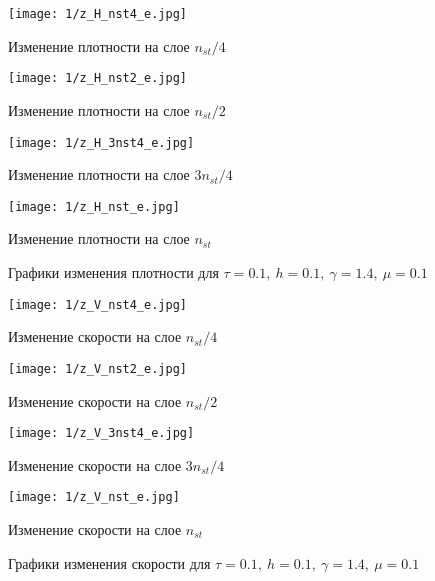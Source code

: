 \begin{figure}[h]
	\begin{minipage}[h]{0.47\linewidth}
		\centering
		\texttt{[image: 1/z\_H\_nst4\_e.jpg]} 
		\caption{Изменение плотности на слое $n_{st} / 4$}
	\end{minipage}
	\hfill
	\begin{minipage}[h]{0.47\linewidth}
		\centering
		\texttt{[image: 1/z\_H\_nst2\_e.jpg]} 
		\caption{Изменение плотности на слое $n_{st} / 2$}
	\end{minipage}
\end{figure}
\begin{figure}[h]
	\begin{minipage}[h]{0.47\linewidth}
		\centering
		\texttt{[image: 1/z\_H\_3nst4\_e.jpg]} 
		\caption{Изменение плотности на слое $3n_{st} / 4$}
	\end{minipage}
	\hfill
	\begin{minipage}[h]{0.47\linewidth}
		\centering
		\texttt{[image: 1/z\_H\_nst\_e.jpg]} 
		\caption{Изменение плотности на слое $n_{st}$}
	\end{minipage}
	\caption{Графики изменения плотности для $\tau = 0.1, \ h = 0.1, \ \gamma = 1.4, \ \mu = 0.1$}
	\label{ris:experimentalcorrelationsignals}
\end{figure}

\begin{figure}[h]
	\begin{minipage}[h]{0.47\linewidth}
		\centering
		\texttt{[image: 1/z\_V\_nst4\_e.jpg]} 
		\caption{Изменение скорости на слое $n_{st} / 4$}
	\end{minipage}
	\hfill
	\begin{minipage}[h]{0.47\linewidth}
		\centering
		\texttt{[image: 1/z\_V\_nst2\_e.jpg]} 
		\caption{Изменение скорости на слое $n_{st} / 2$}
	\end{minipage}
	\vfill
	\begin{minipage}[h]{0.47\linewidth}
		\centering
		\texttt{[image: 1/z\_V\_3nst4\_e.jpg]} 
		\caption{Изменение скорости на слое $3n_{st} / 4$}
	\end{minipage}
	\hfill
	\begin{minipage}[h]{0.47\linewidth}
		\centering
		\texttt{[image: 1/z\_V\_nst\_e.jpg]} 
		\caption{Изменение скорости на слое $n_{st}$}
	\end{minipage}
	\caption{Графики изменения скорости для $\tau = 0.1, \ h = 0.1, \ \gamma = 1.4, \ \mu = 0.1$}
	\label{ris:experimentalcorrelationsignals}
\end{figure}

